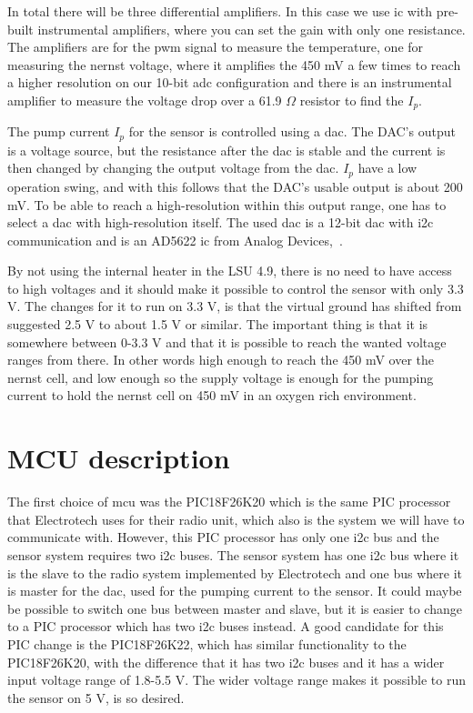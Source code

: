 In total there will be three differential amplifiers. In this case we use \ac{ic} with pre-built instrumental amplifiers, where you can set the gain with only one resistance. The amplifiers are for the \ac{pwm} signal to measure the temperature, one for measuring the nernst voltage, where it amplifies the 450 mV a few times to reach a higher resolution on our 10-bit \ac{adc} configuration and there is an instrumental amplifier to measure the voltage drop over a 61.9 $\Omega$ resistor to find the $I_p$.


The pump current $I_p$ for the sensor is controlled using a \ac{dac}. The DAC's output is a voltage source, but the resistance after the \ac{dac} is stable and the current is then changed by changing the output voltage from the \ac{dac}. $I_p$ have a low operation swing, and with this follows that the DAC's usable output is about 200 mV. To be able to reach a high-resolution within this output range, one has to select a \ac{dac} with high-resolution itself. The used \ac{dac} is a 12-bit \ac{dac} with \ac{i2c} communication and is an AD5622 \ac{ic} from Analog Devices,~\cite{AD5622}.


By not using the internal heater in the LSU 4.9, there is no need to have access to high voltages and it should make it possible to control the sensor with only 3.3 V. The changes for it to run on 3.3 V, is that the virtual ground has shifted from suggested 2.5 V to about 1.5 V or similar. The important thing is that it is somewhere between 0-3.3 V and that it is possible to reach the wanted voltage ranges from there. In other words high enough to reach the 450 mV over the nernst cell, and low enough so the supply voltage is enough for the pumping current to hold the nernst cell on 450 mV in an oxygen rich environment.




\section{MCU description}

The first choice of \ac{mcu} was the PIC18F26K20 which is the same PIC processor that Electrotech uses for their radio unit, which also is the system we will have to communicate with. However, this PIC processor has only one \ac{i2c} bus and the sensor system requires two \ac{i2c} buses. The sensor system has one \ac{i2c} bus where it is the slave to the radio system implemented by Electrotech and one bus where it is master for the \ac{dac}, used for the pumping current to the sensor. It could maybe be possible to switch one bus between master and slave, but it is easier to change to a PIC processor which has two \ac{i2c} buses instead. A good candidate for this PIC change is the PIC18F26K22, which has similar functionality to the PIC18F26K20, with the difference that it has two \ac{i2c} buses and it has a wider input voltage range of 1.8-5.5 V. The wider voltage range makes it possible to run the sensor on 5 V, is so desired. 

